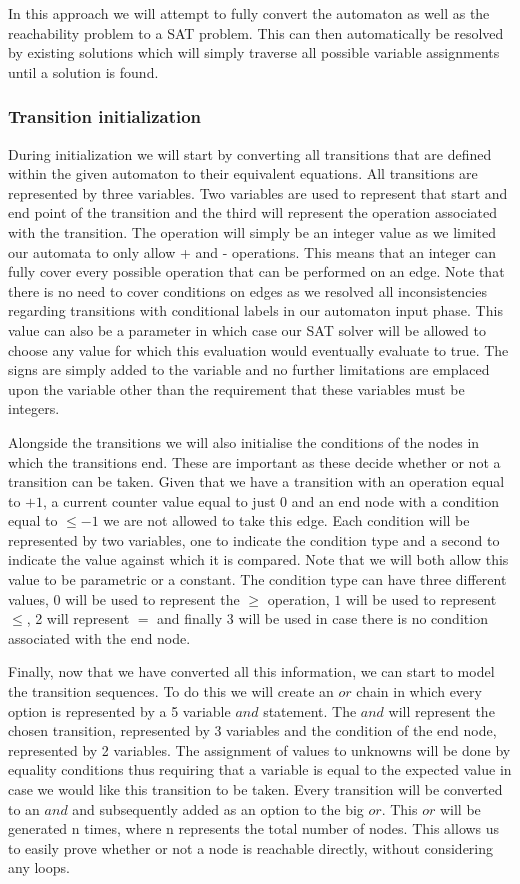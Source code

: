 \documentclass[12pt]{article}
\begin{document}
In this approach we will attempt to fully convert the automaton as well as the reachability problem to a SAT problem. This can then automatically be resolved by existing solutions which will simply traverse all possible variable assignments until a solution is found.

\subsubsection{Transition initialization}
During initialization we will start by converting all transitions that are defined within the given automaton to their equivalent equations. All transitions are represented by three variables. Two variables are used to represent that start and end point of the transition and the third will represent the operation associated with the transition. The operation will simply be an integer value as we limited our automata to only allow + and - operations. This means that an integer can fully cover every possible operation that can be performed on an edge. Note that there is no need to cover conditions on edges as we resolved all inconsistencies regarding transitions with conditional labels in our automaton input phase. This value can also be a parameter in which case our SAT solver will be allowed to choose any value for which this evaluation would eventually evaluate to true. The signs are simply added to the variable and no further limitations are emplaced upon the variable other than the requirement that these variables must be integers.

Alongside the transitions we will also initialise the conditions of the nodes in which the transitions end. These are important as these decide whether or not a transition can be taken. Given that we have a transition with an operation equal to $+1$, a current counter value equal to just $0$ and an end node with a condition equal to $\le -1$ we are not allowed to take this edge. Each condition will be represented by two variables, one to indicate the condition type and a second to indicate the value against which it is compared. Note that we will both allow this value to be parametric or a constant. The condition type can have three different values, $0$ will be used to represent the $\ge$ operation, $1$ will be used to represent $\le$, 2 will represent $=$ and finally $3$ will be used in case there is no condition associated with the end node.

Finally, now that we have converted all this information, we can start to model the transition sequences. To do this we will create an $or$ chain in which every option is represented by a 5 variable $and$ statement. The $and$ will represent the chosen transition, represented by 3 variables and the condition of the end node, represented by 2 variables. The assignment of values to unknowns will be done by equality conditions thus requiring that a variable is equal to the expected value in case we would like this transition to be taken. Every transition will be converted to an $and$ and subsequently added as an option to the big $or$. This $or$ will be generated n times, where n represents the total number of nodes. This allows us to easily prove whether or not a node is reachable directly, without considering any loops. 
\end{document}
